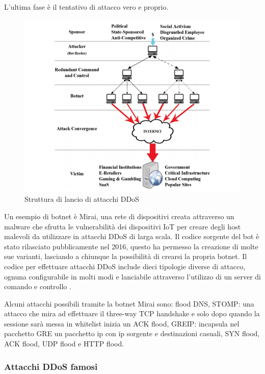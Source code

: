 L'ultima fase è il tentativo di attacco vero e proprio.

\begin{figure}[h]
    \includegraphics[width=\hsize]{images/introduzione/struttura_botnets_2.png}
    \caption{Struttura di lancio di attacchi DDoS \cite{ddos_survey_4}}
    \centering
\end{figure}

Un esempio di botnet è Mirai, una rete di dispositivi creata attraverso un malware che sfrutta le vulnerabilità dei dispositivi IoT per creare degli host malevoli da utilizzare in attacchi DDoS di larga scala. Il codice sorgente del bot è stato rilasciato pubblicamente nel 2016, questo ha permesso la creazione di molte sue varianti, lasciando a chiunque la possibilità  di crearsi la propria botnet.
Il codice per effettuare attacchi DDoS include dieci tipologie diverse di attacco, ognuna configurabile in molti modi e lanciabile attraverso l'utilizzo di un server di comando e controllo \cite{slide_mirai}.

Alcuni attacchi possibili tramite la botnet Mirai sono: flood DNS, STOMP: una attacco che mira ad effettuare il three-way TCP handshake e solo dopo quando la sessione sarà messa in whitelist inizia un ACK flood, GREIP: incapsula nel pacchetto GRE un pacchetto ip con ip sorgente e destinazioni casuali, SYN flood, ACK flood, UDP flood e HTTP flood.

\subsubsection{Attacchi DDoS famosi}

